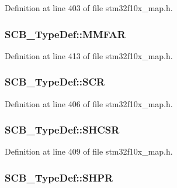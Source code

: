 Definition at line 403 of file stm32f10x\+\_\+map.\+h.

\subsubsection[{\texorpdfstring{M\+M\+F\+AR}{MMFAR}}]{ S\+C\+B\+\_\+\+Type\+Def\+::\+M\+M\+F\+AR}\hypertarget{struct_s_c_b___type_def_a5f569314b5438b50ebc6c2f5397c5fa1}{}\label{struct_s_c_b___type_def_a5f569314b5438b50ebc6c2f5397c5fa1}


Definition at line 413 of file stm32f10x\+\_\+map.\+h.

\subsubsection[{\texorpdfstring{S\+CR}{SCR}}]{ S\+C\+B\+\_\+\+Type\+Def\+::\+S\+CR}\hypertarget{struct_s_c_b___type_def_a76d72e3b95d53db9a5749ea70d5e28f1}{}\label{struct_s_c_b___type_def_a76d72e3b95d53db9a5749ea70d5e28f1}


Definition at line 406 of file stm32f10x\+\_\+map.\+h.

\subsubsection[{\texorpdfstring{S\+H\+C\+SR}{SHCSR}}]{ S\+C\+B\+\_\+\+Type\+Def\+::\+S\+H\+C\+SR}\hypertarget{struct_s_c_b___type_def_acf8d2216f847e8c32fdc1d2894846c5d}{}\label{struct_s_c_b___type_def_acf8d2216f847e8c32fdc1d2894846c5d}


Definition at line 409 of file stm32f10x\+\_\+map.\+h.

\subsubsection[{\texorpdfstring{S\+H\+PR}{SHPR}}]{ S\+C\+B\+\_\+\+Type\+Def\+::\+S\+H\+PR}\hypertarget{struct_s_c_b___type_def_aa059b7c15e155c023556bf6b4ba64809}{}\label{struct_s_c_b___type_def_aa059b7c15e155c023556bf6b4ba64809}


